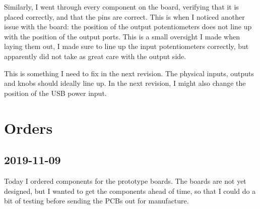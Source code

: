 \documentclass[a4paper]{article}
\begin{document}
Similarly, I went through every component on the board, verifying that it is placed correctly, and that the pins are correct. This is when I noticed another issue with the board: the position of the output potentiometers does not line up with the position of the output ports. This is a small oversight I made when laying them out, I made sure to line up the input potentiometers correctly, but apparently did not take as great care with the output side. 

\begin{center}
\small
{}
\end{center}

This is something I need to fix in the next revision. The physical inputs, outputs and knobs should ideally line up. In the next revision, I might also change the position of the USB power input.

\section{Orders}

\subsection{2019-11-09}

Today I ordered components for the prototype boards. The boards are not yet designed, but I wanted to get the components ahead of time, so that I could do a bit of testing before sending the PCBs out for manufacture.
\end{document}

